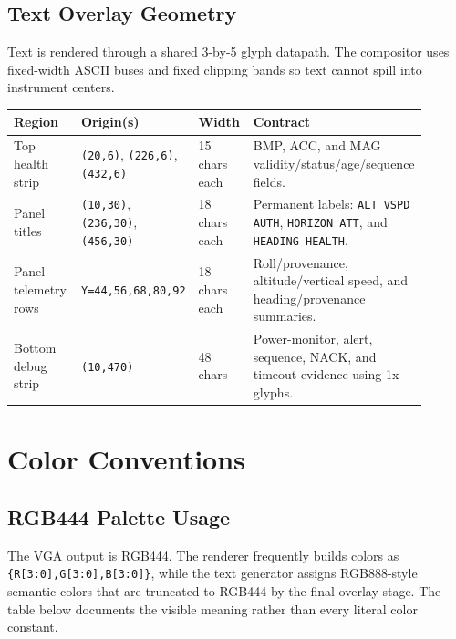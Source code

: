 \documentclass{article}
\newcommand{\sig}[1]{\begingroup\nolinkurl{#1}\endgroup}
\begin{document}
\subsection{Text Overlay Geometry}

Text is rendered through a shared 3-by-5 glyph datapath.  The compositor uses
fixed-width ASCII buses and fixed clipping bands so text cannot spill into
instrument centers.

\begin{longtable}{p{0.22\linewidth} p{0.18\linewidth} p{0.16\linewidth} p{0.34\linewidth}}
\toprule
\textbf{Region} & \textbf{Origin(s)} & \textbf{Width} & \textbf{Contract} \\
\midrule
\endhead
Top health strip &
\sig{(20,6)}, \sig{(226,6)}, \sig{(432,6)} &
15 chars each &
BMP, ACC, and MAG validity/status/age/sequence fields. \\

Panel titles &
\sig{(10,30)}, \sig{(236,30)}, \sig{(456,30)} &
18 chars each &
Permanent labels: \sig{ALT VSPD AUTH}, \sig{HORIZON ATT}, and
\sig{HEADING HEALTH}. \\

Panel telemetry rows &
\sig{Y=44,56,68,80,92} &
18 chars each &
Roll/provenance, altitude/vertical speed, and heading/provenance summaries. \\

Bottom debug strip &
\sig{(10,470)} &
48 chars &
Power-monitor, alert, sequence, NACK, and timeout evidence using 1x glyphs. \\
\bottomrule
\end{longtable}

\section{Color Conventions}

\subsection{RGB444 Palette Usage}

The VGA output is RGB444.  The renderer frequently builds colors as
\sig{\{R[3:0],G[3:0],B[3:0]\}}, while the text generator assigns RGB888-style
semantic colors that are truncated to RGB444 by the final overlay stage.  The
table below documents the visible meaning rather than every literal color
constant.
\end{document}

